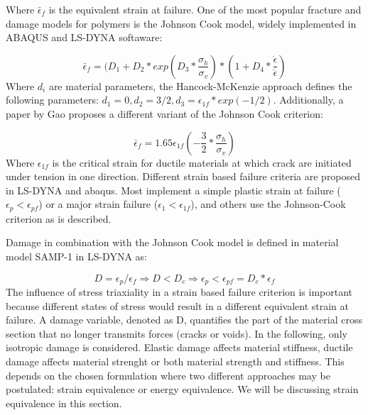Where $\bar\epsilon_f$ is the equivalent strain at failure. 
One of the most popular fracture and damage models for polymers is the Johnson Cook model, widely implemented in ABAQUS and LS-DYNA softaware:

\begin{equation}\label{AzziTsai}
\bar\epsilon_f=(D_1+D_2*exp{(D_3*\frac{\sigma_h}{\sigma_v})}*(1+D_4*\frac{\dot{\epsilon}}{\dot{\epsilon}})
\end{equation}
Where $d_i$ are material parameters\cite{BoisA:}, the Hancock-McKenzie approach defines the following parameters: $d_1=0, d_2=3/2, d_3=\epsilon_{1f}*exp(-1/2)$. Additionally, a paper by Gao \cite{Gao2013CriticalPipelines} proposes a different variant of the Johnson Cook criterion:

\begin{equation}\label{eqn:JC}
\bar\epsilon_{f}=1.65\epsilon_{1f}{(-\frac{3}{2}*\frac{\sigma_h}{\sigma_v})}
\end{equation}Where $\epsilon_{1f}$ is the critical strain for ductile materials at which crack are initiated under tension in one direction. Different strain based failure criteria are proposed in LS-DYNA and abaqus. Most implement a simple plastic strain at failure ($\epsilon_p<\epsilon_{pf}$) or a major strain failure ($\epsilon_1<\epsilon_{1f}$), and others use the Johnson-Cook criterion as is described.  

Damage in combination with the Johnson Cook model is defined in material model SAMP-1 in LS-DYNA as:

\begin{equation}\label{AzziTsai}
D=\epsilon_p/\epsilon_f\Rightarrow D<D_c\Rightarrow\epsilon_p<\epsilon_{pf}=D_c*\epsilon_f
\end{equation}The influence of stress triaxiality in a strain based failure criterion is important because different states of stress would result in a different equivalent strain at failure\cite{BoisA:}. 
A damage variable, denoted as D, quantifies the part of the material cross section that no longer transmits forces (cracks or voids). In the following, only isotropic damage is considered. Elastic damage affects material stiffness, ductile damage affects material strenght or both material strength and stiffness. This depends on the chosen formulation where two different approaches may be postulated: strain equivalence or energy equivalence. We will be discussing strain equivalence in this section. 

